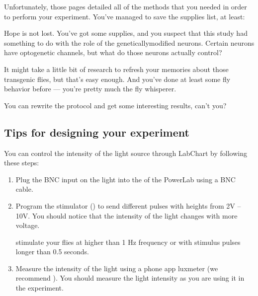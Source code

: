 \documentclass[letterpaper,10pt,english]{jupyterBook}
\begin{document}
\sphinxAtStartPar
Unfortunately, those pages detailed all of the methods that you needed in order to perform your experiment. You’ve managed to save the supplies list, at least:

\sphinxAtStartPar
{}

\sphinxAtStartPar
Hope is not lost. You’ve got some supplies, and you suspect that this study had something to do with the role of the genetically\sphinxhyphen{}modified neurons. Certain neurons have optogenetic channels, but what do those neurons actually control?

\sphinxAtStartPar
It might take a little bit of research to refresh your memories about those transgenic flies, but that’s easy enough. And you’ve done at least some fly behavior before — you’re pretty much the fly whisperer.

\sphinxAtStartPar
You can re\sphinxhyphen{}write the protocol and get some interesting results, can’t you?


\subsection{Tips for designing your experiment}
\label{\detokenize{Drosophila/Day2:tips-for-designing-your-experiment}}
\sphinxAtStartPar
You can control the intensity of the light source through LabChart by following these steps:
\begin{enumerate}
%
\item {} 
\sphinxAtStartPar
Plug the BNC input on the light into the  of the PowerLab using a BNC cable.

\item {} 
\sphinxAtStartPar
Program the stimulator () to send different pulses with heights from 2V – 10V. You should notice that the intensity of the light changes with more voltage.

\sphinxAtStartPar
{} stimulate your flies at higher than 1 Hz frequency or with stimulus pulses longer than 0.5 seconds.

\item {} 
\sphinxAtStartPar
Measure the intensity of the light using a phone app luxmeter (we recommend ). You should measure the light intensity  as you are using it in the experiment.

\end{enumerate}
\end{document}
